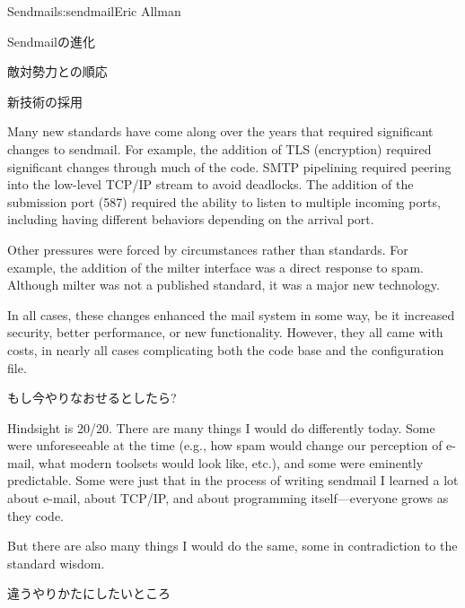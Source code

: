 \begin{aosachapter}{Sendmail}{s:sendmail}{Eric Allman}
\begin{aosasect1}{Sendmailの進化}
\begin{aosasect2}{敵対勢力との順応}
\end{aosasect2}

\begin{aosasect2}{新技術の採用}

Many new standards have come along over the years that required
significant changes to sendmail. For example, the addition of TLS
(encryption) required significant changes through much of the
code. SMTP pipelining required peering into the low-level TCP/IP
stream to avoid deadlocks. The addition of the submission port (587)
required the ability to listen to multiple incoming ports, including
having different behaviors depending on the arrival port.

Other pressures were forced by circumstances rather than standards.
For example, the addition of the milter interface was a direct
response to spam. Although milter was not a published standard, it was
a major new technology.

In all cases, these changes enhanced the mail system in some way, be
it increased security, better performance, or new
functionality. However, they all came with costs, in nearly all cases
complicating both the code base and the configuration file.

\end{aosasect2}

\end{aosasect1}

\begin{aosasect1}{もし今やりなおせるとしたら?}

Hindsight is 20/20. There are many things I would do differently
today.  Some were unforeseeable at the time (e.g., how spam would
change our perception of e-mail, what modern toolsets would look like,
etc.), and some were eminently predictable. Some were just that in the
process of writing sendmail I learned a lot about e-mail, about TCP/IP,
and about programming itself---everyone grows as they code.

But there are also many things I would do the same, some in
contradiction to the standard wisdom.

\begin{aosasect2}{違うやりかたにしたいところ}


\end{aosasect2}
\end{aosasect1}
\end{aosachapter}
